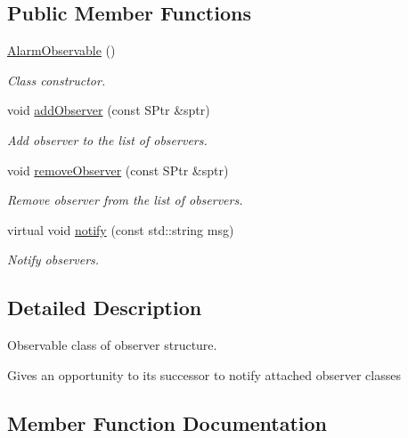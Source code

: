 \subsection*{Public Member Functions}
\begin{DoxyCompactItemize}
\item 
\hyperlink{classAlarmObservable_afd9c686eed16b00d73f8257d052021b4}{Alarm\+Observable} ()\hypertarget{classAlarmObservable_afd9c686eed16b00d73f8257d052021b4}{}\label{classAlarmObservable_afd9c686eed16b00d73f8257d052021b4}

\begin{DoxyCompactList}\small\item\em Class constructor. \end{DoxyCompactList}\item 
void \hyperlink{classAlarmObservable_aa8cf379c39c2c4a1e87925a6e79dfa11}{add\+Observer} (const S\+Ptr \&sptr)
\begin{DoxyCompactList}\small\item\em Add observer to the list of observers. \end{DoxyCompactList}\item 
void \hyperlink{classAlarmObservable_a76733a3271e053f105c428f3d878aa7e}{remove\+Observer} (const S\+Ptr \&sptr)
\begin{DoxyCompactList}\small\item\em Remove observer from the list of observers. \end{DoxyCompactList}\item 
virtual void \hyperlink{classAlarmObservable_afe90d2612d363050a620eb8b2ef2fa0a}{notify} (const std\+::string msg)
\begin{DoxyCompactList}\small\item\em Notify observers. \end{DoxyCompactList}\end{DoxyCompactItemize}


\subsection{Detailed Description}
Observable class of observer structure. 

Gives an opportunity to its successor to notify attached observer classes 

\subsection{Member Function Documentation}
